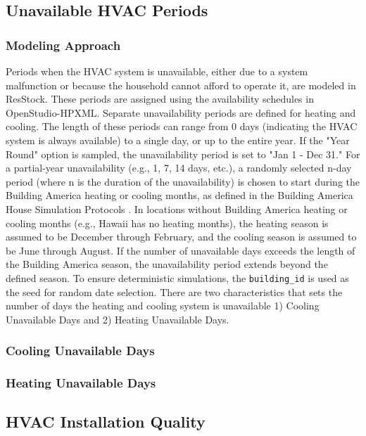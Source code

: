 \subsection{Unavailable HVAC Periods}
\subsubsection{Modeling Approach}
Periods when the HVAC system is unavailable, either due to a system malfunction or because the household cannot afford to operate it, are modeled in ResStock. These periods are assigned using the availability schedules in OpenStudio-HPXML. Separate unavailability periods are defined for heating and cooling. The length of these periods can range from 0 days (indicating the HVAC system is always available) to a single day, or up to the entire year. If the "Year Round" option is sampled, the unavailability period is set to "Jan 1 - Dec 31." For a partial-year unavailability (e.g., 1, 7, 14 days, etc.), a randomly selected n-day period (where n is the duration of the unavailability) is chosen to start during the Building America heating or cooling months, as defined in the Building America House Simulation Protocols \cite{bahsp_2014}. In locations without Building America heating or cooling months (e.g., Hawaii has no heating months), the heating season is assumed to be December through February, and the cooling season is assumed to be June through August. If the number of unavailable days exceeds the length of the Building America season, the unavailability period extends beyond the defined season. To ensure deterministic simulations, the \texttt{building\_id} is used as the seed for random date selection. There are two characteristics that sets the number of days the heating and cooling system is unavailable 1) Cooling Unavailable Days and 2) Heating Unavailable Days.

\subsubsection{Cooling Unavailable Days}


\subsubsection{Heating Unavailable Days}


\subsection{HVAC Installation Quality}
